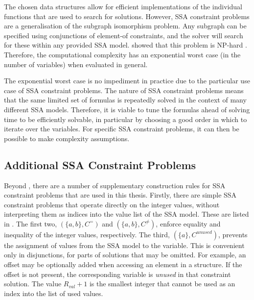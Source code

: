     The chosen data structures allow for efficient implementations
    of the individual functions that are used to search for solutions.
    However, SSA constraint problems are a generalisation of the subgraph
    isomorphism problem.
    Any subgraph can be specified using conjunctions of element-of constraints,
    and the solver will search for these within any provided SSA model.
    \citet{Cook:1971:CTP:800157.805047} showed that this problem is NP-hard
    \citep{Leeuwen:1990:HTC:574797}.
    Therefore, the computational complexity has an exponential worst case
    (in the number of variables) when evaluated in general.

    The exponential worst case is no impediment in practice due to the
    particular use case of SSA constraint problems.
    The nature of SSA constraint problems means that the same
    limited set of formulas is repeatedly solved in the context of many different
    SSA models.
    Therefore, it is viable to tune the formulas ahead of solving time to be
    efficiently solvable, in particular by choosing a good order in which to
    iterate over the variables.
    For specific SSA constraint problems, it can then be possible to make
    complexity assumptions.

\subsection{Additional SSA Constraint Problems}

    Beyond , there are a
    number of supplementary construction rules for SSA constraint problems that
    are used in this thesis.
    Firstly, there are simple SSA constraint problems that operate directly on
    the integer values, without interpreting them as indices into the value list
    of the SSA model.
    These are listed in .
    The first two, $(\{a,b\}, C^=)$ and $(\{a,b\}, C^{\neq})$, enforce
    equality and inequality of the integer values, respectively.
    The third, $(\{a\}, C^{unused})$, prevents the assignment of values from
    the SSA model to the variable.
    This is convenient only in disjunctions, for parts of solutions that may be
    omitted.
    For example, an offset may be optionally added when accessing an element
    in a structure.
    If the offset is not present, the corresponding variable is {\it unused} in
    that constraint solution.
    The value $ R_{val}+1$ is the smallest integer that cannot be used as an
    index into the list of used values.

